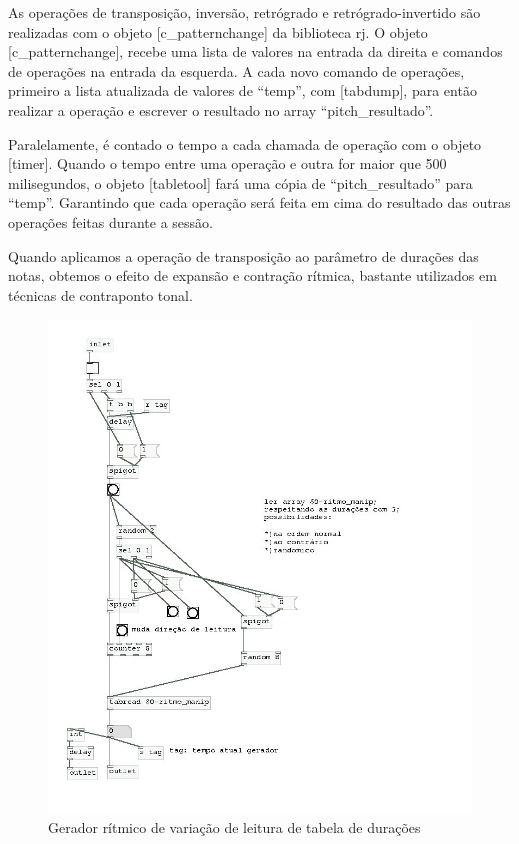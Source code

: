 \documentclass{ppgmus}
\begin{document}
As operações de transposição, inversão, retrógrado e retrógrado-invertido são 
realizadas com o objeto [c\_patternchange] da biblioteca rj. 
O objeto [c\_patternchange], recebe uma lista de valores na entrada
da direita e comandos de operações na entrada da esquerda. A cada novo
comando de operações, primeiro a lista atualizada de valores de ``temp'', 
com [tabdump], para então realizar a operação e escrever o resultado no
array ``pitch\_resultado''.

Paralelamente, é contado o tempo a cada chamada de operação com o objeto
[timer]. Quando o tempo entre uma operação e outra for maior que 500 milisegundos,
o objeto [tabletool] fará uma cópia de ``pitch\_resultado'' para ``temp''. Garantindo
 que cada operação será feita em cima do resultado das outras operações
feitas durante a sessão. 

Quando aplicamos a operação de transposição ao parâmetro
de durações das notas, obtemos o efeito de expansão e contração
rítmica, bastante utilizados em técnicas de contraponto tonal.

\begin{figure}
\includegraphics[scale=.6]{gerador-ritmico1}
\caption{Gerador rítmico de variação de leitura de tabela de durações}
\label{gera-ritmico1}
\end{figure}  
\end{document}

